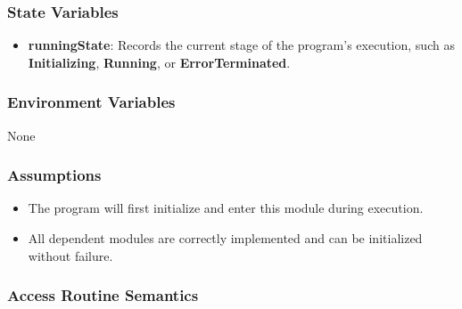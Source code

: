 \documentclass[12pt, titlepage]{article}
\begin{document}
\subsubsection{State Variables}

\begin{itemize}
\item \textbf{runningState}: Records the current stage of the program's
execution, such as \textbf{Initializing}, \textbf{Running}, or
\textbf{ErrorTerminated}.
\end{itemize}

\subsubsection{Environment Variables}

None

\subsubsection{Assumptions}

\begin{itemize}
\item The program will first initialize and enter this module during execution.
\item All dependent modules are correctly implemented and can be initialized
without failure.
\end{itemize}

\subsubsection{Access Routine Semantics}
\end{document}
